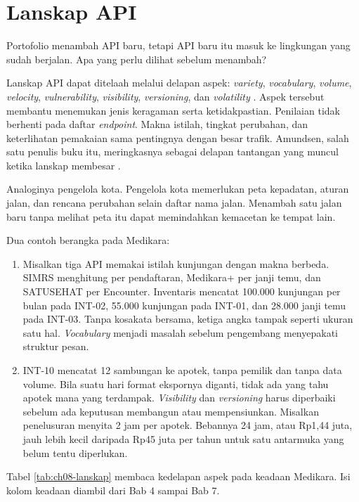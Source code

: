 \section{Lanskap API}

Portofolio menambah API baru, tetapi API baru itu masuk ke lingkungan yang sudah berjalan. Apa yang perlu dilihat sebelum
menambah?

Lanskap API dapat ditelaah melalui delapan aspek: \textit{variety}, \textit{vocabulary}, \textit{volume}, \textit{velocity},
\textit{vulnerability}, \textit{visibility}, \textit{versioning}, dan \textit{volatility} \cite{medjaoui2021continuous}.
Aspek tersebut membantu menemukan jenis keragaman serta ketidakpastian. Penilaian tidak berhenti pada daftar
\textit{endpoint}. Makna istilah, tingkat perubahan, dan keterlihatan pemakaian sama pentingnya dengan besar trafik.
Amundsen, salah satu penulis buku itu, meringkasnya sebagai delapan tantangan yang muncul ketika lanskap membesar
\cite{c08-amundsen2020}.

Analoginya pengelola kota. Pengelola kota memerlukan peta kepadatan, aturan jalan, dan rencana perubahan selain daftar nama
jalan. Menambah satu jalan baru tanpa melihat peta itu dapat memindahkan kemacetan ke tempat lain.

Dua contoh berangka pada Medikara:
\begin{enumerate}
  \item Misalkan tiga API memakai istilah kunjungan dengan makna berbeda. SIMRS menghitung per pendaftaran, Medikara+ per janji
        temu, dan SATUSEHAT per Encounter. Inventaris mencatat 100.000 kunjungan per bulan pada INT-02, 55.000 kunjungan pada
        INT-01, dan 28.000 janji temu pada INT-03. Tanpa kosakata bersama, ketiga angka tampak seperti ukuran satu hal.
        \textit{Vocabulary} menjadi masalah sebelum pengembang menyepakati struktur pesan.
  \item INT-10 mencatat 12 sambungan ke apotek, tanpa pemilik dan tanpa data volume. Bila suatu hari format ekspornya diganti,
        tidak ada yang tahu apotek mana yang terdampak. \textit{Visibility} dan \textit{versioning} harus diperbaiki sebelum
        ada keputusan membangun atau mempensiunkan. Misalkan penelusuran menyita 2 jam per apotek. Bebannya 24 jam, atau
        Rp1,44 juta, jauh lebih kecil daripada Rp45 juta per tahun untuk satu antarmuka yang belum tentu diperlukan.
\end{enumerate}

Tabel \ref{tab:ch08-lanskap} membaca kedelapan aspek pada keadaan Medikara. Isi kolom keadaan diambil dari Bab 4 sampai Bab 7.

